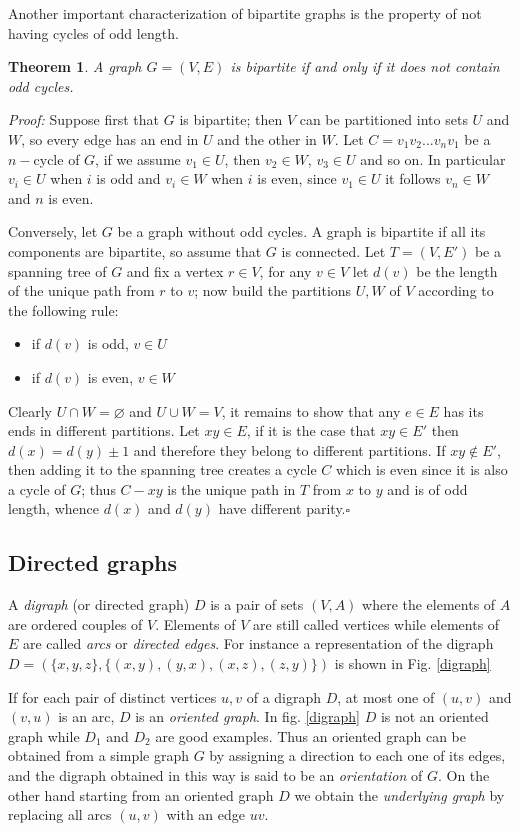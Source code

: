 \documentclass[a4paper,12pt,oneside]{book}
\newtheorem{theorem}{Theorem}[chapter]
\newcommand*{\QED}{\hfill\ensuremath{\square}}
\let\emptyset\varnothing
\begin{document}
\newpage
Another important characterization of bipartite graphs is the property of not having cycles of odd length.
\begin{theorem}
A graph $G=(V,E)$ is bipartite if and only if it does not contain odd cycles.
\end{theorem}
\textit{Proof:}
Suppose first that $G$ is bipartite; then $V$ can be partitioned into sets $U$ and $W$, so every edge has an end in $U$ and the other in $W$. Let $C=v_1v_2...v_nv_1$ be a $n-$cycle of $G$, if we assume $v_1\in U$, then $v_2\in W$, $v_3\in U$ and so on.
In particular $v_i\in U $ when $i$ is odd and $v_i\in W$ when $i$ is even, since $v_1\in U$ it follows $v_n\in W$ and $n$ is even.

Conversely, let $G$ be a graph without odd cycles. A graph is bipartite if all its components are bipartite, so assume that $G$ is connected. Let $T=(V,E')$ be a spanning tree of $G$ and fix a vertex $r\in V$, for any $v\in V$ let $d(v)$ be the length of the unique path from $r$ to $v$; now build the partitions $U,W$ of $V$ according to the following rule:
\begin{itemize}
\item if $d(v)$ is odd, $v\in U$
\item if $d(v)$ is even, $v\in W$
\end{itemize} 
Clearly $U\cap W =\emptyset$ and $U\cup W=V$, it remains to show that any $e\in E$ has its ends in different partitions. 
Let $xy\in E$, if it is the case that $xy\in E'$ then $d(x)=d(y)\pm 1$ and therefore they belong to different partitions. If $xy\notin E'$, then adding it to the spanning tree creates a cycle $C$ which is even since it is also a cycle of $G$; thus $C-xy$ is the unique path in $T$ from $x$ to $y$ and is of odd length, whence $d(x)$ and $d(y)$ have different parity.\QED


\subsection*{Directed graphs}

A \textit{digraph} (or directed graph) $D$  is a pair of sets $(V,A)$ where the elements of $A$ are ordered couples of $V$. Elements of $V$ are still called vertices while elements of $E$ are called \textit{arcs} or \textit{directed edges}. For instance a representation of the digraph $D=(\{x,y,z\}, \{(x,y),(y,x),(x,z),(z,y)\})$ is shown in Fig. \ref{digraph}

If for each pair of distinct vertices $u,v$ of a digraph $D$, at most one of $(u,v)$ and $(v,u)$ is an arc, $D$ is an \textit{oriented graph}. In fig. \ref{digraph} $D$ is not an oriented graph while $D_1$ and $D_2$ are good examples. Thus an oriented graph can be obtained from a simple graph $G$ by assigning a direction to each one of its edges, and the digraph obtained in this way is said to be an \textit{orientation} of $G$. On the other hand starting from an oriented graph $D$ we obtain the \textit{underlying graph } by replacing all arcs $(u,v)$ with an edge $uv$. 
\end{document}
